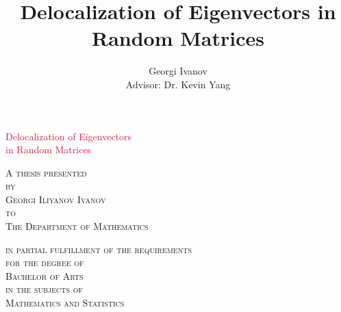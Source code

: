 \documentclass[11pt]{article}
\title{Delocalization of Eigenvectors in Random Matrices}
\author{Georgi Ivanov\\Advisor: Dr. Kevin Yang}
\date{}
\begin{document}
\renewcommand{\refname}{References}
\renewcommand{\contentsname}{Contents}


\begin{titlepage}
    \begin{center}
        \vspace*{4cm}
        
        \Huge{\textcolor{crimson}{Delocalization of Eigenvectors \\ \vspace{-0.5cm} in Random Matrices}}
        
        \vspace{2cm}
        
        \Large{A \textsc{thesis presented\\
        \vspace{-0.5cm}
		by\\
		\vspace{-0.5cm}
        Georgi Iliyanov Ivanov\\
        \vspace{-0.5cm}
			to\\ \vspace{-0.5cm}
        The Department of Mathematics}}
        
        \vspace{1cm}
        
        \Large{\textsc{in partial fulfillment of the requirements\\ \vspace{-0.5cm}
        for the degree of\\ \vspace{-0.5cm}
        Bachelor of Arts\\ \vspace{-0.5cm}
        in the subjects of\\ \vspace{-0.5cm}
        Mathematics and Statistics}}
        

\end{center}
\end{titlepage}
\end{document}

